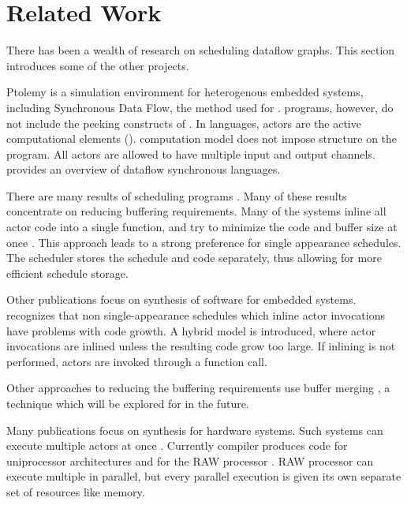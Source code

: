 \section{Related Work}
\label{chpt:related}

There has been a wealth of research on scheduling dataflow graphs.
This section introduces some of the other projects.

Ptolemy \cite{ptolemyoverview} is a simulation environment for
heterogenous embedded systems, including Synchronous Data Flow,
the method used for {\StreamIt}. {\SDF} programs, however, do not
include the peeking constructs of {\StreamIt}.  In {\SDF} languages,
actors are the active computational elements ({\filters}).  {\SDF}
computation model does not impose structure on the program.  All
actors are allowed to have multiple input and output channels.
\cite{benveniste93dataflow} provides an overview of dataflow
synchronous languages.

There are many results of scheduling {\SDF} programs
\cite{leesdf}. Many of these results concentrate on reducing buffering
requirements. Many of the systems inline all actor code into a single
function, and try to minimize the code and buffer size at once
\cite{bhattacharyya99synthesis}.  This approach leads to a strong
preference for single appearance schedules.  The {\StreamIt} scheduler
stores the schedule and {\filter} code separately, thus allowing for
more efficient schedule storage.

Other publications focus on synthesis of software for embedded
systems. \cite{bhat1999x1} recognizes that non single-appearance
schedules which inline actor invocations have problems with code
growth.  A hybrid model is introduced, where actor invocations are
inlined unless the resulting code grow too large. If inlining is
not performed, actors are invoked through a function call.

Other approaches to reducing the buffering requirements use buffer
merging \cite{murthy99buffer}, a technique which will be explored
for {\StreamIt} in the future.

Many publications focus on synthesis for hardware systems.  Such
systems can execute multiple actors at once
\cite{govindarajan-minimizing}.  Currently {\StreamIt} compiler
produces code for uniprocessor architectures \cite{streamittech2}
and for the RAW processor \cite{gordo-thesis}.  RAW processor can
execute multiple {\filters} in parallel, but every parallel
execution is given its own separate set of resources like memory.

